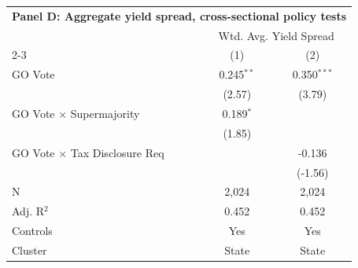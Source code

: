 \begingroup
\centering
\begin{tabular*}{\textwidth}{@{\extracolsep{\fill}}lcc}
\multicolumn{3}{l}{\textbf{Panel D: Aggregate yield spread, cross-sectional policy tests}}\\

\addlinespace
   \toprule
    & \multicolumn{2}{c}{Wtd. Avg. Yield Spread}\\
   \cmidrule(lr){2-3}
                                        & (1)          & (2)\\  
   \midrule 
   GO Vote                              & 0.245$^{**}$ & 0.350$^{***}$\\   
                                        & (2.57)      & (3.79)\\   
   GO Vote $\times$ Supermajority       & 0.189$^{*}$  &   \\   
                                        & (1.85)      &   \\   
   GO Vote $\times$ Tax Disclosure Req  &              & -0.136\\   
                                        &              & (-1.56)\\   
   \hline
   N                         & 2,024        & 2,024\\  
   Adj. R$^2$                       & 0.452        & 0.452\\  
   Controls                   & Yes            & Yes\\
   Cluster              & State & State\\  
   \bottomrule
\end{tabular*}
\par\endgroup
